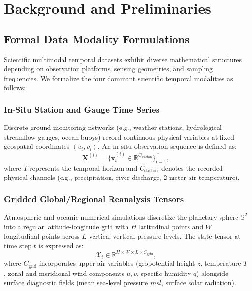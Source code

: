 \section{Background and Preliminaries}
\label{sec:background}

\subsection{Formal Data Modality Formulations}
Scientific multimodal temporal datasets exhibit diverse mathematical structures depending on observation platforms, sensing geometries, and sampling frequencies. We formalize the four dominant scientific temporal modalities as follows:

\subsubsection{In-Situ Station and Gauge Time Series}
Discrete ground monitoring networks (e.g., weather stations, hydrological streamflow gauges, ocean buoys) record continuous physical variables at fixed geospatial coordinates $(u_i, v_i)$. An in-situ observation sequence is defined as:
\begin{equation}
    \mathbf{X}^{(i)} = \{ \mathbf{x}_t^{(i)} \in \mathbb{R}^{C_{\text{station}}} \}_{t=1}^{T},
\end{equation}
where $T$ represents the temporal horizon and $C_{\text{station}}$ denotes the recorded physical channels (e.g., precipitation, river discharge, 2-meter air temperature).

\subsubsection{Gridded Global/Regional Reanalysis Tensors}
Atmospheric and oceanic numerical simulations discretize the planetary sphere $\mathbb{S}^2$ into a regular latitude-longitude grid with $H$ latitudinal points and $W$ longitudinal points across $L$ vertical vertical pressure levels. The state tensor at time step $t$ is expressed as:
\begin{equation}
    \mathcal{X}_t \in \mathbb{R}^{H \times W \times L \times C_{\text{grid}}},
\end{equation}
where $C_{\text{grid}}$ incorporates upper-air variables (geopotential height $z$, temperature $T$, zonal and meridional wind components $u, v$, specific humidity $q$) alongside surface diagnostic fields (mean sea-level pressure $msl$, surface solar radiation).

